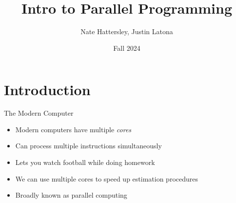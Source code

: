 \documentclass[aspectratio=1610,handout]{beamer}
\title{Intro to Parallel Programming}
\author{Nate Hattersley, Justin Latona}
\date{Fall 2024}
\begin{document}
\frame[plain]{\titlepage}

\section{Introduction}


\begin{frame}{The Modern Computer}
    \begin{itemize}
        \item Modern computers have multiple \textit{cores}
        \item Can process multiple instructions simultaneously
        \pause
        \item Lets you watch football while doing homework
        \pause
        \item We can use multiple cores to speed up estimation procedures
        \item Broadly known as parallel computing
    \end{itemize}
\end{frame}
\end{document}
